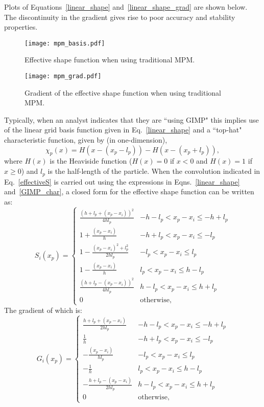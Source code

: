 Plots of Equations~\ref{linear_shape} and~\ref{linear_shape_grad} are shown
below.  The discontinuity in the gradient gives rise to poor accuracy and
stability properties.

\begin{figure}
  \texttt{[image: mpm\_basis.pdf]}
  \caption{Effective shape function when using traditional MPM.}
  \label{Fig:MPMShape}
\end{figure}

\begin{figure}
  \texttt{[image: mpm\_grad.pdf]}
  \caption{Gradient of the effective shape function when using traditional MPM.}
  \label{Fig:MPMShapeGrad}
\end{figure}

Typically, when an analyst indicates that
they are ``using GIMP" this implies use of the linear grid basis function
given in Eq.~\ref{linear_shape} and a ``top-hat" characteristic function,
given by (in one-dimension),
\begin{equation}
\chi_p(x) = H(x-(x_p-l_p))-H(x-(x_p+l_p)) , \label{GIMP_char}
\end{equation}
where $H(x)$ is the Heaviside function
($H(x)=0$ if $x<0$ and $H(x)=1$ if $x\ge0$) and $l_p$ is the half-length
of the particle.  When the convolution indicated in Eq.~\ref{effectiveS}
is carried out using the expressions in Eqns.~\ref{linear_shape}
 and~\ref{GIMP_char}, a closed form for the effective shape function can be
written as:
\begin{equation}
S_{i}\left(x_p\right) = \begin{cases}
   \frac{\left(h+l_p+\left(x_p-x_i\right)\right)^2}{4hl_p} & {-h -l_p < x_p-x_i \le -h+l_p} \\
   1 + \frac{\left(x_p-x_i\right)}{h} & {-h + l_p < x_p-x_i \le -l_p} \\
   1 - \frac{\left(x_p-x_i\right)^2 + l_p^2}{2hl_p} & {-l_p < x_p-x_i \le l_p} \\
   1 - \frac{\left(x_p-x_i\right)}{h} & {l_p  < x_p-x_i \le h-l_p} \\
   \frac{\left(h+l_p-\left(x_p-x_i\right)\right)^2}{4hl_p} & {h -l_p < x_p-x_i \le h+l_p} \\
   0 & \text{otherwise},
\end{cases}
\label{gimp_shape}
\end{equation}
%
The gradient of which is:
\begin{equation}
G_i(x_p) = \begin{cases}
   \frac{h+l_p+\left(x_p-x_i\right)}{2 h l_p} & {-h -l_p < x_p-x_i \le -h+l_p} \\
   \frac{1}{h} & {-h + l_p < x_p-x_i \le -l_p} \\
   - \frac{\left(x_p-x_i\right)}{h l_p} & {-l_p < x_p-x_i \le l_p} \\
   - \frac{1}{h} & {l_p  < x_p-x_i \le h-l_p} \\
   - \frac{h+l_p-\left(x_p-x_i\right)}{2 h l_p} & {h -l_p < x_p-x_i \le h+l_p} \\
   0 & \text{otherwise},
\end{cases}
\label{gimpGrad}
\end{equation}


